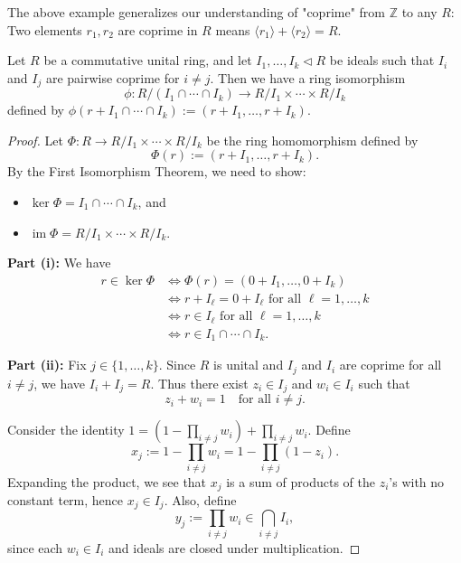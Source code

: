The above example generalizes our understanding of "coprime" from $\mathbb{Z}$ to any $R$: 
Two elements $r_1,r_2$ are coprime in $R$ means $\langle r_1\rangle+\langle r_2\rangle=R$.

\begin{theorem}
Let $R$ be a commutative unital ring, and let $I_1, \ldots, I_k \triangleleft R$ be ideals such that $I_i$ and $I_j$ are pairwise coprime for $i \neq j$. Then we have a ring isomorphism 
$$\phi: R/(I_1 \cap \cdots \cap I_k) \rightarrow R/I_1 \times \cdots \times R/I_k$$ 
defined by $\phi(r + I_1 \cap \cdots \cap I_k) := (r + I_1, \ldots, r + I_k)$.
\end{theorem}

\begin{proof}
Let $\Phi: R \rightarrow R/I_1 \times \cdots \times R/I_k$ be the ring homomorphism defined by 
$$\Phi(r) := (r + I_1, \ldots, r + I_k).$$
By the First Isomorphism Theorem, we need to show:
\begin{itemize}
\item[(i)] $\ker\Phi = I_1 \cap \cdots \cap I_k$, and 
\item[(ii)] $\operatorname{im}\Phi = R/I_1 \times \cdots \times R/I_k$.
\end{itemize}

\textbf{Part (i):} We have
\begin{align*}
r \in \ker\Phi 
&\Leftrightarrow \Phi(r) = (0 + I_1, \ldots, 0 + I_k) \\
&\Leftrightarrow r + I_\ell = 0 + I_\ell \text{ for all } \ell = 1, \ldots, k \\
&\Leftrightarrow r \in I_\ell \text{ for all } \ell = 1, \ldots, k \\
&\Leftrightarrow r \in I_1 \cap \cdots \cap I_k.
\end{align*}

\textbf{Part (ii):} Fix $j \in \{1, \ldots, k\}$. Since $R$ is unital and $I_j$ and $I_i$ are coprime for all $i \neq j$, we have $I_i + I_j = R$. Thus there exist $z_i \in I_j$ and $w_i \in I_i$ such that 
$$z_i + w_i = 1 \quad \text{for all } i \neq j.$$

Consider the identity $1 = (1 - \prod_{i \neq j} w_i) + \prod_{i \neq j} w_i$. Define
$$x_j := 1 - \prod_{i \neq j} w_i = 1 - \prod_{i \neq j} (1 - z_i).$$
Expanding the product, we see that $x_j$ is a sum of products of the $z_i$'s with no constant term, hence $x_j \in I_j$. Also, define
$$y_j := \prod_{i \neq j} w_i \in \bigcap_{i \neq j} I_i,$$
since each $w_i \in I_i$ and ideals are closed under multiplication.


\end{proof}
